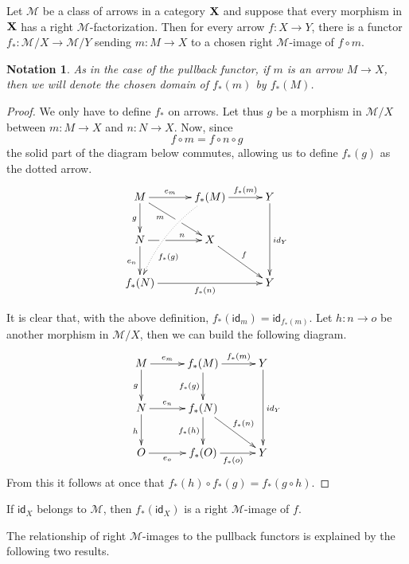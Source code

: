 \documentclass[a4paper,UKenglish,cleveref,pdftex,thm-restate,numberwithinsect]{lipics-v2021}
\newcommand{\id}[1]{\mathsf{id}_{#1}}
\def\X{\textbf {\textup{X}}}
\newtheorem*{notation}{Notation}
\begin{document}
\begin{proposition}\label{prop:im}
	Let $\mathcal{M}$ be a class of arrows in a category $\X$ and suppose that every morphism in $\X$ has a right $\mathcal{M}$-factorization. Then for every arrow $f\colon X\to Y$, there is a functor $f_*\colon \mathcal{M}/X\to \mathcal{M}/Y$ sending $m\colon M\to X$ to a chosen right $\mathcal{M}$-image of $f\circ m$.
\end{proposition}
\begin{notation}
	As in the case of the pullback functor, if $m$ is an arrow $M\to X$, then we will denote the chosen domain of $f_*(m)$ by $f_*(M)$.
\end{notation}
\begin{proof}
	We only have to define $f_*$ on arrows. Let thus $g$ be a morphism in $\mathcal{M}/X$ between $m\colon M\to X$ and $n\colon N\to X$. Now, since \[f\circ m = f\circ n\circ g\] the solid part of the diagram below commutes, allowing us to define $f_*(g)$ as the dotted arrow.
	\[\xymatrix@C=30pt{M \ar[dr]_(.35){m}|(.55)\hole\ar[r]^-{e_m} \ar[d]_{g}& f_*(M)  \ar@/_.3cm/@{.>}[ddl]^(.7){f_*(g)}\ar[r]^-{f_*(m)}& Y \ar[dd]^{\id{Y}}\\N \ar[d]_{e_n} \ar[r]|(.32)\hole^(.6){n} & X  \ar[dr]^{f}\\f_*(N) \ar[rr]_{f_*(n)}&& Y}\]
	
	It is clear that, with the above definition, $f_*(\id{m})=\id{f_*(m)}$. Let $h\colon n\to o$ be another morphism in $\mathcal{M}/X$, then we can build the following diagram.
	\[\xymatrix@C=30pt{M \ar[r]^-{e_m} \ar[d]_{g}& f_*(M)  \ar[d]_{f_*(g)}\ar[r]^-{f_*(m)}& Y \ar[dd]^{\id{Y}}\\N \ar[r]^-{e_n} \ar[d]_{h} & f_*(N) \ar[d]_{f_*(h)} \ar[dr]^{f_*(n)}\\O\ar[r]_-{e_o}& f_*(O) \ar[r]_{f_*(o)}& Y}\]
	From this it follows at once that $f_*(h)\circ f_*(g)=f_*(g\circ h)$.
\end{proof}
\begin{remark} If $\id{X}$ belongs to $\mathcal{M}$, then $f_*(\id{X})$ is a right $\mathcal{M}$-image of $f$.
\end{remark}

The relationship of right $\mathcal{M}$-images to the pullback functors is explained by the following two results.
\end{document}
